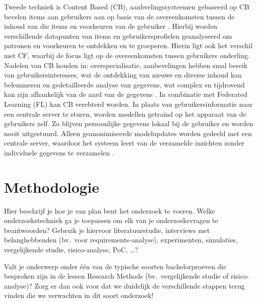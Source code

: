 Tweede techniek is Content Based (CB), aanbvelingssysteemen gebaseerd op CB bevelen items aan gebruikers aan op basis van de overeenkomsten tussen de inhoud van die items en voorkeuren van de gebruiker \autocite{Lops2010,Pazzani2007}. Hierbij worden verschillende datapunten van items en gebruikersprofielen geanalyseerd om patronen en voorkeuren te ontdekken en te groeperen. Hierin ligt ook het verschil met CF, waarbij de focus ligt op de overeenkomsten tussen gebruikers onderling. Nadelen van CB houden in: overspecialisatie, aanbevelingen hebben smal bereik van gebruikersinteresses, wat de ontdekking van nieuwe en diverse inhoud kan belemmeren en gedetailleerde analyse van gegevens, wat complex en tijdrovend kan zijn afhankelijk van de aard van de gegevens \autocite{Patel2020,Lops2010}.
In combinatie met Federated Learning (FL) kan CB verebterd worden. In plaats van gebruikersinformatie naar een centrale server te sturen, worden modellen getraind op het apparaat van de gebruikers zelf. Zo blijven persoonlijke gegevens lokaal bij de gebruiker en worden nooit uitgestuurd. Alleen geanonimiseerde modelupdates worden gedeeld met een centrale server, waardoor het systeem leert van de verzamelde inzichten zonder individuele gegevens te verzamelen \autocite{Wang2018, Lops2010}.



\section{Methodologie}%
\label{sec:methodologie}

Hier beschrijf je hoe je van plan bent het onderzoek te voeren. Welke onderzoekstechniek ga je toepassen om elk van je onderzoeksvragen te beantwoorden? Gebruik je hiervoor literatuurstudie, interviews met belanghebbenden (bv.~voor requirements-analyse), experimenten, simulaties, vergelijkende studie, risico-analyse, PoC, \ldots?

Valt je onderwerp onder één van de typische soorten bachelorproeven die besproken zijn in de lessen Research Methods (bv.\ vergelijkende studie of risico-analyse)? Zorg er dan ook voor dat we duidelijk de verschillende stappen terug vinden die we verwachten in dit soort onderzoek!

